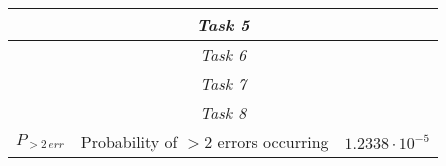 \begin{center}
\begin{longtable}{|c|c|c|}
    \hline\multicolumn{3}{|c|}{\textit{Task 5}} \\\hline


    \hline\multicolumn{3}{|c|}{\textit{Task 6}} \\\hline


    \hline\multicolumn{3}{|c|}{\textit{Task 7}} \\\hline


    \hline\multicolumn{3}{|c|}{\textit{Task 8}} \\
    $P_{>2\,err}$ & Probability of $>2$ errors occurring & $ 1.2338\cdot10^{-5} $ \\

    \end{longtable}
\renewcommand{\arraystretch}{1}
\end{center}







\setcounter{secnumdepth}{1}